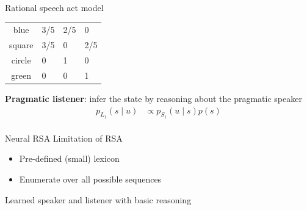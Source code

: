 \documentclass[usenames,dvipsnames,notes]{beamer}
\begin{document}
\begin{frame}
    {Rational speech act model}
    \begin{center}
        \begin{tabular}{cp{2cm}p{2cm}p{2cm}}
        blue   & 3/5 & 2/5   & 0 \\
        square & 3/5 & 0     & 2/5 \\
        circle & 0   & 1   & 0 \\
        green  & 0   & 0     & 1 
        \end{tabular}
    \end{center}
    \textbf{Pragmatic listener}: infer the state by reasoning about the pragmatic speaker
    \begin{align*}
        p_{L_1}(s\mid u) &\propto p_{S_1}(u\mid s)p(s) \\
    \end{align*}
\end{frame}

\begin{frame}
    {Neural RSA}
    Limitation of RSA\\
    \begin{itemize}
        \item Pre-defined (small) lexicon
        \item Enumerate over all possible sequences
    \end{itemize}

    Learned speaker and listener with basic reasoning \mycite{[Andreas+ 2016]}
\end{frame}
\end{document}
